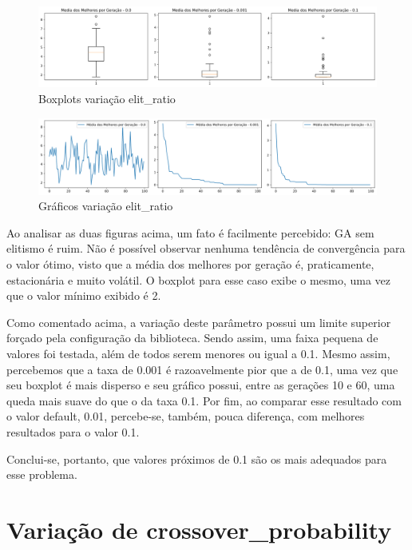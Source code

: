 \documentclass[12pt]{article}
\begin{document}
	\begin{figure}[H]
		\centering
		\includegraphics[width=0.9\linewidth]{Imagens/elitismo/boxplotElitismo}
		\caption{Boxplots variação elit\_ratio}
		\label{fig:boxplotelitismo}
	\end{figure}
	\begin{figure}[H]
		\centering
		\includegraphics[width=0.9\linewidth]{Imagens/elitismo/graficoElitismo}
		\caption{Gráficos variação elit\_ratio}
		\label{fig:graficoelitismo}
	\end{figure}
	
	Ao analisar as duas figuras acima, um fato é facilmente percebido: GA sem elitismo é ruim. Não é possível observar nenhuma tendência de convergência para o valor ótimo, visto que a média dos melhores por geração é, praticamente, estacionária e muito volátil. O boxplot para esse caso exibe o mesmo, uma vez que o valor mínimo exibido é 2. 
	
	Como comentado acima, a variação deste parâmetro possui um limite superior forçado pela configuração da biblioteca. Sendo assim, uma faixa pequena de valores foi testada, além de todos serem menores ou igual a 0.1. Mesmo assim, percebemos que a taxa de 0.001 é razoavelmente pior que a de 0.1, uma vez que seu boxplot é mais disperso e seu gráfico possui, entre as gerações 10 e 60, uma queda mais suave do que o da taxa 0.1. Por fim, ao comparar esse resultado com o valor default, 0.01, percebe-se, também, pouca diferença, com melhores resultados para o valor 0.1.
	
	Conclui-se, portanto, que valores próximos de 0.1 são os mais adequados para esse problema.
	
	
	\section{Variação de crossover\_probability}
	
\end{document}
